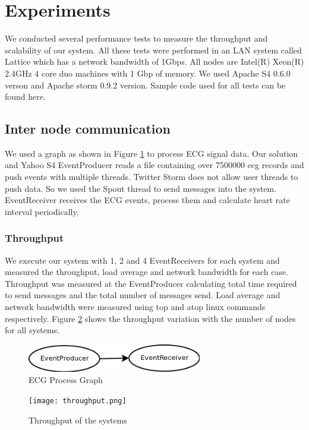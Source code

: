 \section{Experiments}

We conducted several performance tests to measure the throughput and scalability of our system. All these tests were performed in an LAN system called Lattice which has a network bandwidth of 1Gbps. All nodes are Intel(R) Xeon(R) 2.4GHz 4 core duo machines with 1 Gbp of memory. We used Apache S4 0.6.0 verson and Apache storm 0.9.2 version. Sample code used for all tests can be found here\cite{solutionCode}.


\subsection{Inter node communication}
We used a graph as shown in Figure \ref{ecgGraph} to process ECG signal data. Our solution and Yahoo S4\cite{neumeyer2010s4} EventProducer reads a file containing over 7500000 ecg records and push events with multiple threads. Twitter Storm\cite{twitterStorm} does not allow user threads to push data. So we used the Spout thread to send messages into the system. EventReceiver  receives the ECG events, process them and calculate heart rate interval periodically.  
\subsubsection{Throughput}
We execute our system with 1, 2 and 4  EventReceivers for each system and measured the throughput, load average and network bandwidth  for each case. Throughput was measured at the EventProducer calculating total time required to send messages and the total number of messages send. Load average and network bandwidth were measured using top and atop linux commands respectively. Figure \ref{throuput} shows the throughput variation with the number of nodes for all systems. 

\begin{figure}[!t]
        \centering
        \includegraphics[width=3.0in]{ecgGraph.png}
        \caption{ECG Process Graph}
        \label{ecgGraph}
\end{figure}
\begin{figure}[!t]
        \centering
        \texttt{[image: throughput.png]}
        \caption{Throughput of the systems}
        \label{throuput}
\end{figure}

